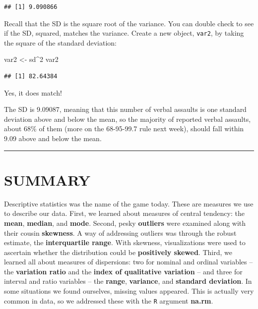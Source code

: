 \documentclass[
]{book}
\newenvironment{Shaded}{\begin{snugshade}}{\end{snugshade}}
\newcommand{\DecValTok}[1]{\textcolor[rgb]{0.00,0.00,0.81}{#1}}
\newcommand{\NormalTok}[1]{#1}
\newcommand{\OtherTok}[1]{\textcolor[rgb]{0.56,0.35,0.01}{#1}}
\newcommand{\SpecialCharTok}[1]{\textcolor[rgb]{0.00,0.00,0.00}{#1}}
\begin{document}
\begin{verbatim}
## [1] 9.090866
\end{verbatim}

Recall that the SD is the square root of the variance. You can double check to see if the SD, squared, matches the variance. Create a new object, \texttt{var2}, by taking the square of the standard deviation:

\begin{Shaded}
\begin{Highlighting}[]
\NormalTok{var2 }\OtherTok{\textless{}{-}}\NormalTok{ sd}\SpecialCharTok{\^{}}\DecValTok{2}
\NormalTok{var2 }
\end{Highlighting}
\end{Shaded}

\begin{verbatim}
## [1] 82.64384
\end{verbatim}

Yes, it does match!

The SD is 9.09087, meaning that this number of verbal assaults is one standard deviation above and below the mean, so the majority of reported verbal assaults, about 68\% of them (more on the 68-95-99.7 rule next week), should fall within 9.09 above and below the mean.

\begin{center}\rule{0.5\linewidth}{0.5pt}\end{center}

\hypertarget{summary-3}{%
\section{SUMMARY}\label{summary-3}}

Descriptive statistics was the name of the game today. These are measures we use to describe our data. First, we learned about measures of central tendency: the \textbf{mean}, \textbf{median}, and \textbf{mode}. Second, pesky \textbf{outliers} were examined along with their cousin \textbf{skewness}. A way of addressing outliers was through the robust estimate, the \textbf{interquartile range}. With skewness, visualizations were used to ascertain whether the distribution could be \textbf{positively skewed}. Third, we learned all about measures of dispersions: two for nominal and ordinal variables -- the \textbf{variation ratio} and the \textbf{index of qualitative variation} -- and three for interval and ratio variables -- the \textbf{range}, \textbf{variance}, and \textbf{standard deviation}. In some situations we found ourselves, missing values appeared. This is actually very common in data, so we addressed these with the \texttt{R} argument \textbf{na.rm}.
\end{document}
